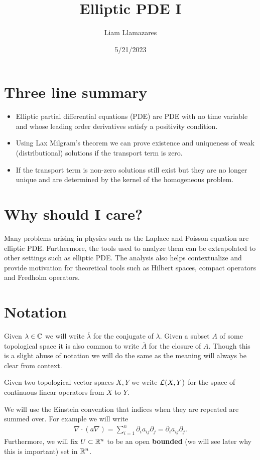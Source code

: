 \documentclass[12pt]{article}
\begin{document}
\title{Elliptic PDE I}
\author{Liam Llamazares}
\date{5/21/2023}
\maketitle
\section{ Three line summary}
\begin{itemize}
  \item Elliptic partial differential equations (PDE) are PDE with no time variable and whose leading order derivatives satisfy a positivity condition.
  \item Using Lax Milgram's theorem we can prove existence and uniqueness of weak (distributional) solutions if the transport term is zero.
  \item If the transport term is non-zero solutions still exist but they are no longer unique and are determined by the kernel of the homogeneous problem.\end{itemize}
\section{Why should I care?}
Many problems arising in physics such as the Laplace and Poisson equation are elliptic PDE. Furthermore, the tools used to analyze them can be extrapolated to other settings such as
elliptic PDE. The analysis also helps contextualize and provide motivation for theoretical tools such as Hilbert spaces, compact operators and Fredholm operators.
\section{Notation}
Given $\lambda \in \mathbb{C}$ we will write $\overline{\lambda }$ for the conjugate of $\lambda $. Given a subset $A$ of some topological space it is also common to write  $\overline{A}$ for the closure of $A$. Though this is a slight abuse of notation we will do the same as the meaning will always be clear from context.

Given two topological vector spaces $X,Y$ we write  $\mathcal{L}(X,Y)$ for the space of continuous linear operators from $X$ to  $Y$.

We will use the Einstein convention that indices when they are repeated are summed over. For example we will write
\begin{align*}
  \nabla \cdot (a \nabla)=\sum_{i=1}^n \partial_i a_{ij} \partial _j =\partial_i a_{ij} \partial _j.
\end{align*}
Furthermore, we will fix $U \subset \mathbb{R}^n$ to be an open \textbf{bounded} (we will see later why this is important) set in $\mathbb{R}^n$.
\end{document}
